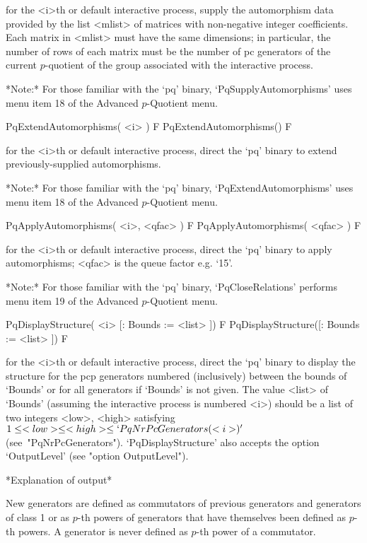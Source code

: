for the  <i>th  or  default  interactive  {\ANUPQ}  process,  supply  the
automorphism  data  provided  by  the  list  <mlist>  of  matrices   with
non-negative integer coefficients. Each matrix in <mlist> must  have  the
same dimensions; in particular, the number of rows of each matrix must be
the number of pc generators of the  current  $p$-quotient  of  the  group
associated with the interactive {\ANUPQ} process.

*Note:* 
For those familiar with the  `pq'  binary,  `PqSupplyAutomorphisms'  uses
menu item 18 of the Advanced $p$-Quotient menu.

\>PqExtendAutomorphisms( <i> ) F
\>PqExtendAutomorphisms() F

for the <i>th or default interactive {\ANUPQ} process,  direct  the  `pq'
binary to extend previously-supplied automorphisms.

*Note:*
For those familiar with the  `pq'  binary,  `PqExtendAutomorphisms'  uses
menu item 18 of the Advanced $p$-Quotient menu.

\>PqApplyAutomorphisms( <i>, <qfac> ) F
\>PqApplyAutomorphisms( <qfac> ) F

for the <i>th or default interactive {\ANUPQ} process,  direct  the  `pq'
binary to apply automorphisms; <qfac> is the queue factor e.g. `15'.

*Note:* 
For those familiar with  the  `pq'  binary,  `PqCloseRelations'  performs
menu item 19 of the Advanced $p$-Quotient menu.

\>PqDisplayStructure( <i> [: Bounds := <list> ]) F
\>PqDisplayStructure([: Bounds := <list> ]) F

for the <i>th or default interactive {\ANUPQ} process,  direct  the  `pq'
binary  to  display  the  structure  for  the  pcp  generators   numbered
(inclusively) between the bounds of `Bounds' or  for  all  generators  if
`Bounds' is not  given.  The  value  <list>  of  `Bounds'  (assuming  the
interactive process is numbered <i>) should be a  list  of  two  integers
<low>,   <high>   satisfying   $1    \le    <low>    \le    <high>    \le
`PqNrPcGenerators(<i>)'$  (see~"PqNrPcGenerators").  `PqDisplayStructure'
also accepts the option `OutputLevel' (see "option OutputLevel").

*Explanation of output*

New generators are defined as  commutators  of  previous  generators  and
generators of class 1  or  as  $p$-th  powers  of  generators  that  have
themselves been defined as $p$-th powers. A generator is never defined as
$p$-th power of a commutator.

